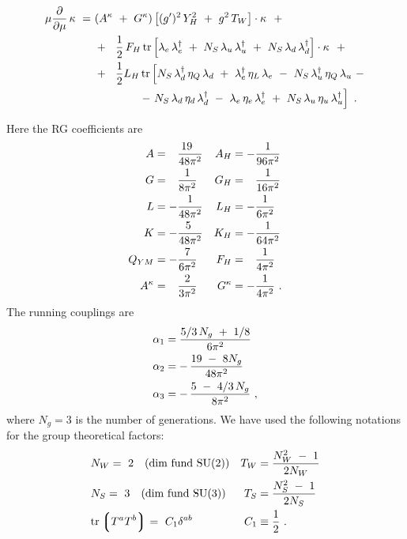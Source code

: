 \documentclass[12pt]{revtex4}
\newcommand{\p}{\partial}
\begin{document}
%
\begin{align}
\notag
	\mu \frac{\p}{\p\mu} \,
	\kappa 
	~=~&
	( A^\kappa ~+~ G^\kappa )
	\left[
		(g')^2\, Y_H^2 ~+~ g^2\, T_W
	\right] \cdot \kappa
	~~+ 
	\\
\notag
	&
	+~~
	\frac{1}{2}\, F_H\, 
	{\rm tr} 
	\left[
		\lambda_e\, \lambda_e^\dag
		~+~
		N_S\, \lambda_u\, \lambda_u^\dag
		~+~
		N_S\, \lambda_d\, \lambda_d^\dag
	\right]
	\cdot \kappa
	~~+
	\\
\notag
	&
	+~~
	\frac{1}{2}
	L_H\,
	{\rm tr} 
	\left[
		N_S\, \lambda_d^\dag\, \eta_Q\, \lambda_d 
		~+~
		\lambda_e^\dag\, \eta_L\, \lambda_e
		~-~
		N_S\, \lambda_u^\dag\, \eta_Q\, \lambda_u
		~-
	\right.
	\\
\notag
	&
	\qquad\qquad
	\left.
		-~
		N_S\, \lambda_d\, \eta_d\, \lambda_d^\dag
		~-~
		\lambda_e\, \eta_e\, \lambda_e^\dag
		~+~
		N_S\, \lambda_u\, \eta_u\, \lambda_u^\dag
	\right]
	~.
\end{align}

	Here the RG coefficients are
%
\begin{align}
\notag
	A & = \phantom{-}\frac{19~\;}{48\pi^2}  & A_H      & = - \frac{1}{96\pi^2} \\
\notag
	G & = \phantom{-}\frac{1}{8\pi^2}     &	G_H 	 & = \phantom{-}
							\frac{1}{16\pi^2}	\\
\notag
	L & = - \frac{1}{48\pi^2}  	      &	L_H 	 & = - \frac{1}{6\pi^2}  \\
\notag
	K & = - \frac{5~}{48\pi^2}  	      &	K_H	 & = - \frac{1}{64\pi^2} \\
\notag
	Q_{YM} & =
		- \frac{7}{6\pi^2} 	      &	F_H & = \phantom{-}\frac{1}{4\pi^2} \\
\notag
	A^\kappa & = \phantom{-}
	          \frac{2}{3\pi^2} 	      &   G^\kappa & = - \frac{1}{4\pi^2} 
	~.
\end{align}
	The running couplings are
%
\begin{align}
\notag
	\alpha_1 & =        
			    \frac{5/3\, N_g ~+~ 1/8}
                                        {6\pi^2}  \\
\notag
	\alpha_2 & =    -\, \frac{19 ~-~ 8 N_g}
		                  {48\pi^2}  \\
\notag
	\alpha_3 & =    -\, \frac{5 ~-~4/3\, N_g}
			         {8\pi^2}~,
\end{align}
	where $ N_g = 3 $ is the number of generations.
	We have used the following notations for the group theoretical
	factors:
\begin{align}
\notag
	& N_W = ~2 \quad\text{(dim fund SU(2))} &
		T_W & = \frac{N_W^2 ~-~ 1}
			       {2 N_W}       
	\\
\notag
	& N_S = ~3 \quad\text{(dim fund SU(3))} &
		T_S & = \frac{N_S^2 ~-~ 1}
			       {2 N_S}
	\\
\notag
	& {\rm tr} \left\lgroup T^a T^b \right\rgroup = 
			~C_1 \delta^{ab} &
		C_1 & \equiv \frac{1}{2}~.
\end{align}
\end{document}
